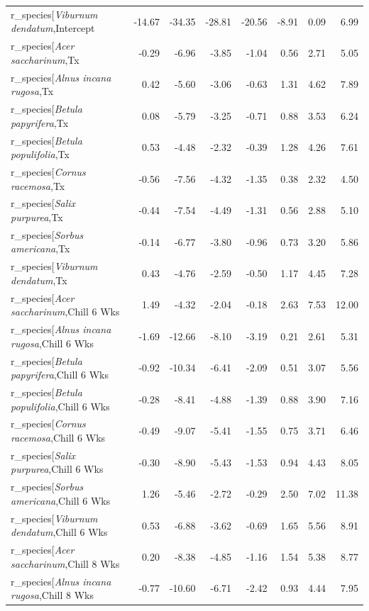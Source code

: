 \documentclass{article}\usepackage[]{graphicx}\usepackage[]{color}
\begin{document}
\begin{longtable}{lrrrrrrr}
  r_species[\textit{Viburnum dendatum},Intercept & -14.67 & -34.35 & -28.81 & -20.56 & -8.91 & 0.09 & 6.99 \\ 
  r_species[\textit{Acer saccharinum},Tx & -0.29 & -6.96 & -3.85 & -1.04 & 0.56 & 2.71 & 5.05 \\ 
  r_species[\textit{Alnus incana rugosa},Tx & 0.42 & -5.60 & -3.06 & -0.63 & 1.31 & 4.62 & 7.89 \\ 
  r_species[\textit{Betula papyrifera},Tx & 0.08 & -5.79 & -3.25 & -0.71 & 0.88 & 3.53 & 6.24 \\ 
  r_species[\textit{Betula populifolia},Tx & 0.53 & -4.48 & -2.32 & -0.39 & 1.28 & 4.26 & 7.61 \\ 
  r_species[\textit{Cornus racemosa},Tx & -0.56 & -7.56 & -4.32 & -1.35 & 0.38 & 2.32 & 4.50 \\ 
  r_species[\textit{Salix purpurea},Tx & -0.44 & -7.54 & -4.49 & -1.31 & 0.56 & 2.88 & 5.10 \\ 
  r_species[\textit{Sorbus americana},Tx & -0.14 & -6.77 & -3.80 & -0.96 & 0.73 & 3.20 & 5.86 \\ 
  r_species[\textit{Viburnum dendatum},Tx & 0.43 & -4.76 & -2.59 & -0.50 & 1.17 & 4.45 & 7.28 \\ 
  r_species[\textit{Acer saccharinum},Chill 6 Wks & 1.49 & -4.32 & -2.04 & -0.18 & 2.63 & 7.53 & 12.00 \\ 
  r_species[\textit{Alnus incana rugosa},Chill 6 Wks & -1.69 & -12.66 & -8.10 & -3.19 & 0.21 & 2.61 & 5.31 \\ 
  r_species[\textit{Betula papyrifera},Chill 6 Wks & -0.92 & -10.34 & -6.41 & -2.09 & 0.51 & 3.07 & 5.56 \\ 
  r_species[\textit{Betula populifolia},Chill 6 Wks & -0.28 & -8.41 & -4.88 & -1.39 & 0.88 & 3.90 & 7.16 \\ 
  r_species[\textit{Cornus racemosa},Chill 6 Wks & -0.49 & -9.07 & -5.41 & -1.55 & 0.75 & 3.71 & 6.46 \\ 
  r_species[\textit{Salix purpurea},Chill 6 Wks & -0.30 & -8.90 & -5.43 & -1.53 & 0.94 & 4.43 & 8.05 \\ 
  r_species[\textit{Sorbus americana},Chill 6 Wks & 1.26 & -5.46 & -2.72 & -0.29 & 2.50 & 7.02 & 11.38 \\ 
  r_species[\textit{Viburnum dendatum},Chill 6 Wks & 0.53 & -6.88 & -3.62 & -0.69 & 1.65 & 5.56 & 8.91 \\ 
  r_species[\textit{Acer saccharinum},Chill 8 Wks & 0.20 & -8.38 & -4.85 & -1.16 & 1.54 & 5.38 & 8.77 \\ 
  r_species[\textit{Alnus incana rugosa},Chill 8 Wks & -0.77 & -10.60 & -6.71 & -2.42 & 0.93 & 4.44 & 7.95 \\ 

\end{longtable}
\end{document}
